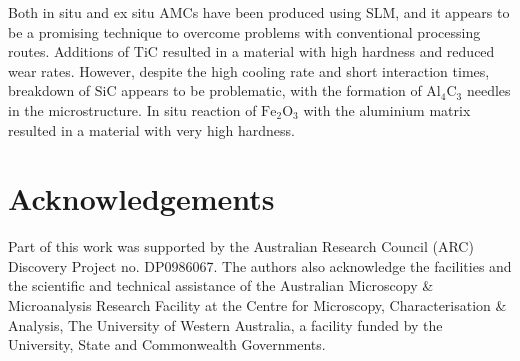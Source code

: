 \documentclass[10pt]{article}
\begin{document}
Both in situ and ex situ AMCs have been produced using SLM, and it appears to be a promising technique to overcome problems with conventional processing routes. Additions of $\mathrm{TiC}$ resulted in a material with high hardness and reduced wear rates. However, despite the high cooling rate and short interaction times, breakdown of $\mathrm{SiC}$ appears to be problematic, with the formation of $\mathrm{Al}_{4} \mathrm{C}_{3}$ needles in the microstructure. In situ reaction of $\mathrm{Fe}_{2} \mathrm{O}_{3}$ with the aluminium matrix resulted in a material with very high hardness.

\section*{Acknowledgements}
Part of this work was supported by the Australian Research Council (ARC) Discovery Project no. DP0986067. The authors also acknowledge the facilities and the scientific and technical assistance of the Australian Microscopy \& Microanalysis Research Facility at the Centre for Microscopy, Characterisation \& Analysis, The University of Western Australia, a facility funded by the University, State and Commonwealth Governments.
\end{document}
